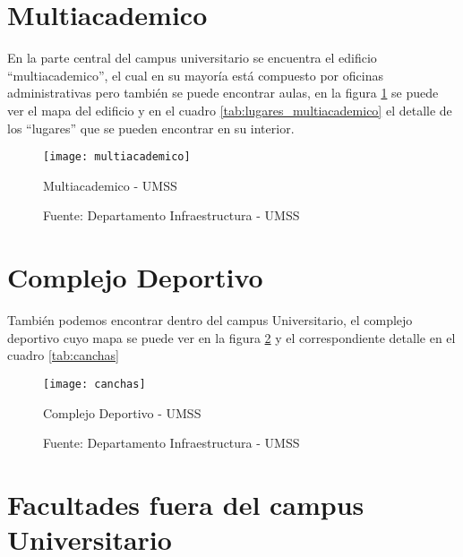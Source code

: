 % 

\section{Multiacademico}
\label{sec:multiacademico}

En la parte central del campus universitario se encuentra el edificio ``multiacademico'', el cual en su mayoría está compuesto por oficinas administrativas pero también se puede encontrar aulas, en la figura \ref{fig:multiacademico} se puede ver el mapa del edificio y en el cuadro \ref{tab:lugares_multiacademico} el detalle de los ``lugares'' que se pueden encontrar en su interior.

\begin{figure}[H]
 \begin{center}
   \texttt{[image: multiacademico]}
   \caption{Multiacademico - UMSS}
   \label{fig:multiacademico}
   \caption*{Fuente: Departamento Infraestructura - UMSS}
 \end{center}
\end{figure}

% 

\section{Complejo Deportivo}
\label{sec:canchas}



También podemos encontrar dentro del campus Universitario, el complejo deportivo cuyo mapa se puede ver en la figura \ref{fig:canchas} y el correspondiente detalle en el cuadro \ref{tab:canchas}

\begin{figure}[H]
 \begin{center}
   \texttt{[image: canchas]}
   \caption{Complejo Deportivo - UMSS}
   \label{fig:canchas}
   \caption*{Fuente: Departamento Infraestructura - UMSS}
 \end{center}
\end{figure}




\section{Facultades fuera del campus Universitario}
\label{sec:Facultades fuera del campus Universitario}

